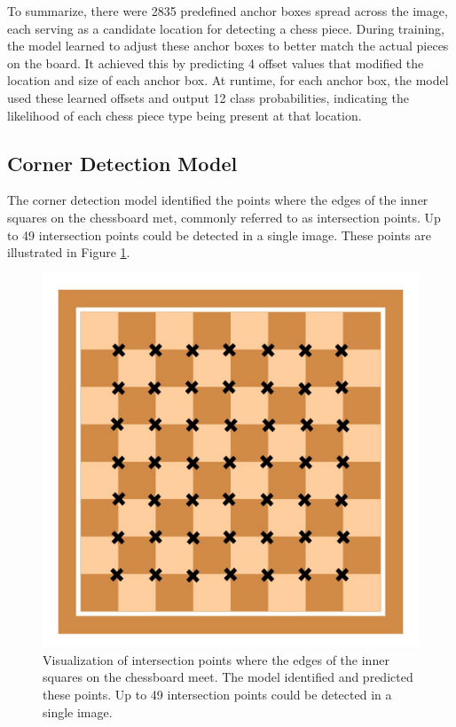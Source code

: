 
To summarize, there were 2835 predefined anchor boxes spread across the image, each serving as a candidate location for detecting a chess piece. During training, the model learned to adjust these anchor boxes to better match the actual pieces on the board. It achieved this by predicting 4 offset values that modified the location and size of each anchor box. At runtime, for each anchor box, the model used these learned offsets and output 12 class probabilities, indicating the likelihood of each chess piece type being present at that location.

\newpage

\subsection{Corner Detection Model}
The corner detection model identified the points where the edges of the inner squares on the chessboard met, commonly referred to as intersection points. Up to 49 intersection points could be detected in a single image. These points are illustrated in Figure \ref{fig:xcorners-chessboard}.

\begin{figure}[h!]
    \centering
    \includegraphics[width=0.75\linewidth]{figures/methods/ml-models/xcorners_chessboard.jpg}
    \caption[s]{Visualization of intersection points where the edges of the inner squares on the chessboard meet. The model identified and predicted these points. Up to 49 intersection points could be detected in a single image. \cite{vectorstock:chessboard-svg}}
    \label{fig:xcorners-chessboard}
\end{figure}

